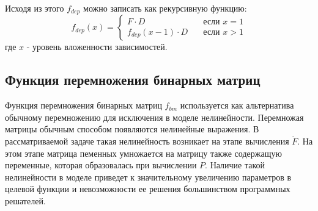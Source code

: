 Исходя из этого $f_{dep}$ можно записать как рекурсивную функцию:
\begin{equation}
  f_{dep}(x) = 
  \begin{cases}
    F \cdot D & \quad \text{если } x = 1 \\
    f_{dep}(x - 1) \cdot D & \quad \text{если } x > 1
  \end{cases}
\end{equation}
где $x$ - уровень вложенности зависимостей.

\subsection*{Функция перемножения бинарных матриц}
Функция перемножения бинарных матриц $f_{bm}$ используется как альтернатива обычному перемножению для исключения в моделе нелинейности. Перемножая матрицы обычным способом появляются нелинейные выражения. В рассматриваемой задаче такая нелинейность возникает на этапе вычисления $\dot{F}$. На этом этапе матрица пеменных умножается на матрицу также содержащую переменные, которая образовалась при вычислении $P$. Наличие такой нелинейности в моделе приведет к значительному увеличению параметров в целевой функции и невозможности ее решения большинством программных решателей.

